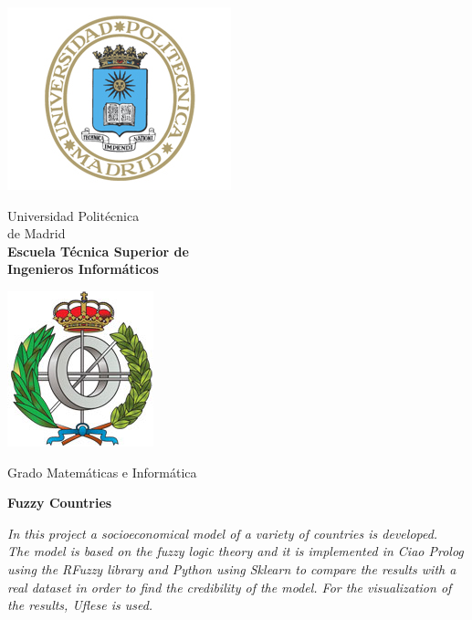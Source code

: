 \begin{titlepage}

\begin{minipage}{0.15\linewidth}
\hspace*{-15mm}
\noindent
\includegraphics[scale=0.5]{portada/escudo_upm.png}
\end{minipage}
\begin{minipage}{0.7\linewidth}
\begin{center}
\huge{ Universidad Politécnica\\de Madrid }\\
\vspace*{0.5cm}
\Large{\textbf{Escuela Técnica Superior de \\
Ingenieros Informáticos}}
\end{center}
\end{minipage}
\begin{minipage}{0.2\linewidth}
\includegraphics[scale=0.5]{portada/escudo_etsiinf.png}
\end{minipage}

\vspace*{1cm}
\begin{center}
\Large{Grado Matemáticas e Informática}
\end{center}

\vspace*{2.5cm}
\begin{center}
\huge\bfseries {Fuzzy Countries}
\end{center}

\vspace*{2cm}
\begin{center}
\textit{In this project a socioeconomical model of a variety of countries is developed. 
\\The model is based on the fuzzy logic theory and it is implemented in Ciao Prolog using the RFuzzy library and Python using Sklearn to compare the results with a real dataset in order to find the credibility of the model. For the visualization of the results, Uflese is used.} 
\end{center}


\end{titlepage}
